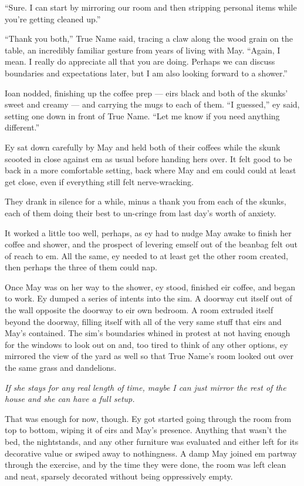 ``Sure. I can start by mirroring our room and then stripping personal items while you're getting cleaned up.''

``Thank you both,'' True Name said, tracing a claw along the wood grain on the table, an incredibly familiar gesture from years of living with May. ``Again, I mean. I really do appreciate all that you are doing. Perhaps we can discuss boundaries and expectations later, but I am also looking forward to a shower.''

Ioan nodded, finishing up the coffee prep — eirs black and both of the skunks' sweet and creamy — and carrying the mugs to each of them. ``I guessed,'' ey said, setting one down in front of True Name. ``Let me know if you need anything different.''

Ey sat down carefully by May and held both of their coffees while the skunk scooted in close against em as usual before handing hers over. It felt good to be back in a more comfortable setting, back where May and em could could at least get close, even if everything still felt nerve-wracking.

They drank in silence for a while, minus a thank you from each of the skunks, each of them doing their best to un-cringe from last day's worth of anxiety.

It worked a little too well, perhaps, as ey had to nudge May awake to finish her coffee and shower, and the prospect of levering emself out of the beanbag felt out of reach to em. All the same, ey needed to at least get the other room created, then perhaps the three of them could nap.

Once May was on her way to the shower, ey stood, finished eir coffee, and began to work. Ey dumped a series of intents into the sim. A doorway cut itself out of the wall opposite the doorway to eir own bedroom. A room extruded itself beyond the doorway, filling itself with all of the very same stuff that eirs and May's contained. The sim's boundaries whined in protest at not having enough for the windows to look out on and, too tired to think of any other options, ey mirrored the view of the yard as well so that True Name's room looked out over the same grass and dandelions.

\emph{If she stays for any real length of time, maybe I can just mirror the rest of the house and she can have a full setup.}

That was enough for now, though. Ey got started going through the room from top to bottom, wiping it of eirs and May's presence. Anything that wasn't the bed, the nightstands, and any other furniture was evaluated and either left for its decorative value or swiped away to nothingness. A damp May joined em partway through the exercise, and by the time they were done, the room was left clean and neat, sparsely decorated without being oppressively empty.

